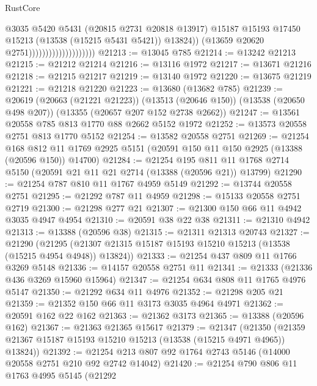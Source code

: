 \begin{lexlean}{RustCore}
\begin{coremodule}
                                              @3035
                                              @5420
                                              @5431
                                              (@20815 @2731 @20818 @13917)
                                              @15187
                                              @15193
                                              @17450
                                              @15213
                                              (@13538 (@15215 @5431 @5421))
                                              @13824))
                                          (@13659 @20620 @2751))))))))))))))))))))
@21213 := @13045 @785
@21214 := @13242 @21213
@21215 := @21212 @21214
@21216 := @13116 @1972
@21217 := @13671 @21216
@21218 := @21215 @21217
@21219 := @13140 @1972
@21220 := @13675 @21219
@21221 := @21218 @21220
@21223 := @13680 (@13682 @785)
@21239 := @20619
    (@20663 (@21221 @21223))
    (@13513 (@20646 @150))
    (@13538 (@20650 @498 @207))
    (@13355 (@20657 @207 @152 @2738 @2662))
@21247 := @13561 @20558 @785 @813 @1770 @88 @2662 @5152 @1972
@21252 := @13573 @20558 @2751 @813 @1770 @5152
@21254 := @13582 @20558 @2751
@21269 := @21254
    @168
    @812
    @11
    @1769
    @2925
    @5151
    (@20591 @150 @11 @150 @2925 (@13388 (@20596 @150)) @14700)
@21284 := @21254
    @195
    @811
    @11
    @1768
    @2714
    @5150
    (@20591 @21 @11 @21 @2714 (@13388 (@20596 @21)) @13799)
@21290 := @21254 @787 @810 @11 @1767 @4959 @5149
@21292 := @13744 @20558 @2751
@21295 := @21292 @787 @11 @4959
@21298 := @15133 @20558 @2751 @2719
@21300 := @21298 @277 @21
@21307 := @21300 @150 @66 @11 @4942 @3035 @4947 @4954
@21310 := @20591 @38 @22 @38
@21311 := @21310 @4942
@21313 := @13388 (@20596 @38)
@21315 := @21311 @21313 @20743
@21327 := @21290
    (@21295 (@21307 @21315 @15187 @15193 @15210 @15213 (@13538 (@15215 @4954 @4948)) @13824))
@21333 := @21254 @437 @809 @11 @1766 @3269 @5148
@21336 := @14157 @20558 @2751 @11
@21341 := @21333 (@21336 @436 @3269 @15960 @15964)
@21347 := @21254 @634 @808 @11 @1765 @4976 @5147
@21350 := @21292 @634 @11 @4976
@21352 := @21298 @205 @21
@21359 := @21352 @150 @66 @11 @3173 @3035 @4964 @4971
@21362 := @20591 @162 @22 @162
@21363 := @21362 @3173
@21365 := @13388 (@20596 @162)
@21367 := @21363 @21365 @15617
@21379 := @21347
    (@21350 (@21359 @21367 @15187 @15193 @15210 @15213 (@13538 (@15215 @4971 @4965)) @13824))
@21392 := @21254 @213 @807 @92 @1764 @2743 @5146 (@14000 @20558 @2751 @210 @92 @2742 @14042)
@21420 := @21254
    @790
    @806
    @11
    @1763
    @4995
    @5145
    (@21292

\end{coremodule}
\end{lexlean}
